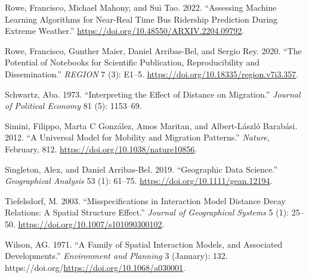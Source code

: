 \documentclass[11pt,letterpaper]{article}
\newlength{\cslhangindent}
\newlength{\cslentryspacingunit} %
\newenvironment{CSLReferences}[2] %
 {%
  \setlength{\parindent}{0pt}
  \ifodd #1
  \let\oldpar\par
  \def\par{\hangindent=\cslhangindent\oldpar}
  \fi
  \setlength{\parskip}{#2\cslentryspacingunit}
 }%
 {}
\begin{document}
\begin{CSLReferences}{1}{0}
\leavevmode{}%
Rowe, Francisco, Michael Mahony, and Sui Tao. 2022. {``Assessing Machine Learning Algorithms for Near-Real Time Bus Ridership Prediction During Extreme Weather.''} \url{https://doi.org/10.48550/ARXIV.2204.09792}.

\leavevmode{}%
Rowe, Francisco, Gunther Maier, Daniel Arribas-Bel, and Sergio Rey. 2020. {``The Potential of Notebooks for Scientific Publication, Reproducibility and Dissemination.''} \emph{REGION} 7 (3): E1--5. \url{https://doi.org/10.18335/region.v7i3.357}.

\leavevmode{}%
Schwartz, Aba. 1973. {``Interpreting the Effect of Distance on Migration.''} \emph{Journal of Political Economy} 81 (5): 1153--69.

\leavevmode{}%
Simini, Filippo, Marta C González, Amos Maritan, and Albert-László Barabási. 2012. {``A Universal Model for Mobility and Migration Patterns.''} \emph{Nature}, February, 812. \url{https://doi.org/10.1038/nature10856}.

\leavevmode{}%
Singleton, Alex, and Daniel Arribas-Bel. 2019. {``Geographic Data Science.''} \emph{Geographical Analysis} 53 (1): 61--75. \url{https://doi.org/10.1111/gean.12194}.

\leavevmode{}%
Tiefelsdorf, M. 2003. {``Misspecifications in Interaction Model Distance Decay Relations: A Spatial Structure Effect.''} \emph{Journal of Geographical Systems} 5 (1): 25--50. \url{https://doi.org/10.1007/s101090300102}.

\leavevmode{}%
Wilson, AG. 1971. {``A Family of Spatial Interaction Models, and Associated Developments.''} \emph{Environment and Planning} 3 (January): 132. https://doi.org/\url{https://doi.org/10.1068/a030001}.

\end{CSLReferences}




\setlength{\bibsep}{0.00cm plus 0.05cm} %


\end{document}
